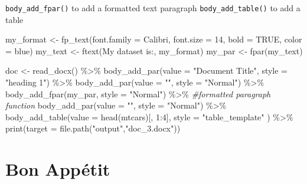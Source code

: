 \documentclass[
]{book}
\newenvironment{Shaded}{\begin{snugshade}}{\end{snugshade}}
\newcommand{\AttributeTok}[1]{\textcolor[rgb]{0.77,0.63,0.00}{#1}}
\newcommand{\CommentTok}[1]{\textcolor[rgb]{0.56,0.35,0.01}{\textit{#1}}}
\newcommand{\ConstantTok}[1]{\textcolor[rgb]{0.00,0.00,0.00}{#1}}
\newcommand{\DecValTok}[1]{\textcolor[rgb]{0.00,0.00,0.81}{#1}}
\newcommand{\FunctionTok}[1]{\textcolor[rgb]{0.00,0.00,0.00}{#1}}
\newcommand{\NormalTok}[1]{#1}
\newcommand{\OtherTok}[1]{\textcolor[rgb]{0.56,0.35,0.01}{#1}}
\newcommand{\SpecialCharTok}[1]{\textcolor[rgb]{0.00,0.00,0.00}{#1}}
\newcommand{\StringTok}[1]{\textcolor[rgb]{0.31,0.60,0.02}{#1}}
\begin{document}
\texttt{body\_add\_fpar()} to add a formatted text paragraph
\texttt{body\_add\_table()} to add a table

\begin{Shaded}
\begin{Highlighting}[]
\NormalTok{my\_format }\OtherTok{\textless{}{-}} \FunctionTok{fp\_text}\NormalTok{(}\AttributeTok{font.family =} \StringTok{\textquotesingle{}Calibri\textquotesingle{}}\NormalTok{, }\AttributeTok{font.size =} \DecValTok{14}\NormalTok{, }\AttributeTok{bold =} \ConstantTok{TRUE}\NormalTok{, }\AttributeTok{color =} \StringTok{\textquotesingle{}blue\textquotesingle{}}\NormalTok{)}
\NormalTok{my\_text }\OtherTok{\textless{}{-}} \FunctionTok{ftext}\NormalTok{(}\StringTok{\textquotesingle{}My dataset is:\textquotesingle{}}\NormalTok{, my\_format)}
\NormalTok{my\_par }\OtherTok{\textless{}{-}} \FunctionTok{fpar}\NormalTok{(my\_text)}

\NormalTok{doc }\OtherTok{\textless{}{-}} \FunctionTok{read\_docx}\NormalTok{() }\SpecialCharTok{\%\textgreater{}\%} 
  \FunctionTok{body\_add\_par}\NormalTok{(}\AttributeTok{value =} \StringTok{"Document Title"}\NormalTok{, }\AttributeTok{style =} \StringTok{"heading 1"}\NormalTok{) }\SpecialCharTok{\%\textgreater{}\%} 
  \FunctionTok{body\_add\_par}\NormalTok{(}\AttributeTok{value =} \StringTok{""}\NormalTok{, }\AttributeTok{style =} \StringTok{"Normal"}\NormalTok{) }\SpecialCharTok{\%\textgreater{}\%} 
  \FunctionTok{body\_add\_fpar}\NormalTok{(my\_par, }\AttributeTok{style =} \StringTok{"Normal"}\NormalTok{) }\SpecialCharTok{\%\textgreater{}\%} \CommentTok{\#formatted paragraph function}
  \FunctionTok{body\_add\_par}\NormalTok{(}\AttributeTok{value =} \StringTok{""}\NormalTok{, }\AttributeTok{style =} \StringTok{"Normal"}\NormalTok{) }\SpecialCharTok{\%\textgreater{}\%} 
  \FunctionTok{body\_add\_table}\NormalTok{(}\AttributeTok{value =} \FunctionTok{head}\NormalTok{(mtcars)[, }\DecValTok{1}\SpecialCharTok{:}\DecValTok{4}\NormalTok{], }\AttributeTok{style =} \StringTok{"table\_template"}\NormalTok{ ) }\SpecialCharTok{\%\textgreater{}\%} 
  \FunctionTok{print}\NormalTok{(}\AttributeTok{target =} \FunctionTok{file.path}\NormalTok{(}\StringTok{"output"}\NormalTok{,}\StringTok{"doc\_3.docx"}\NormalTok{))}
\end{Highlighting}
\end{Shaded}

\hypertarget{part-bon-appuxe9tit}{%
\part*{Bon Appétit}\label{part-bon-appuxe9tit}}
\end{document}
